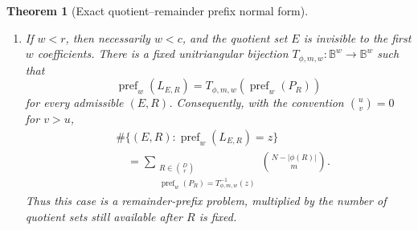 \documentclass[12pt,a4paper]{amsart}
\numberwithin{equation}{section}
\newtheorem{theorem}{Theorem}[section]
\theoremstyle{remark}
\newcommand{\B}{\mathbb B}
\begin{document}
\begin{theorem}[Exact quotient--remainder prefix normal form]
\begin{enumerate}[label=\textup{(\roman*)},leftmargin=*]
\item If $w<r$, then necessarily $w<c$, and the quotient set $E$ is
      invisible to the first $w$ coefficients.  There is a fixed
      unitriangular bijection $T_{\phi,m,w}:\B^w\to\B^w$ such that
      \[
          \operatorname{pref}_w(L_{E,R})
          =T_{\phi,m,w}(\operatorname{pref}_w(P_R))                 \tag{QR3}
      \]
      for every admissible $(E,R)$.  Consequently, with the convention
      \(\binom uv=0\) for $v>u$,
      \[
      \begin{split}
       &\#\{(E,R):\operatorname{pref}_w(L_{E,R})=z\}\\
       &\quad=
       \sum_{\substack{R\in\binom Dr\\
          \operatorname{pref}_w(P_R)=T_{\phi,m,w}^{-1}(z)}}
          \binom{N-|\phi(R)|}{m}.
      \end{split}                                  \tag{QR4}\label{eq:qr-shallow-remainder}
      \]
      Thus this case is a remainder-prefix problem, multiplied by the
      number of quotient sets still available after $R$ is fixed.
\end{enumerate}
\end{theorem}
\end{document}
